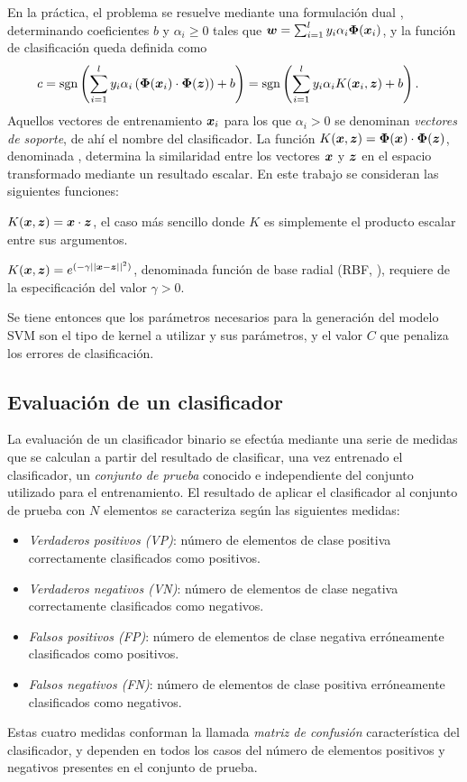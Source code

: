 \documentclass[12pt,bibliography=oldstyle,DIV=12,parskip=half-]{scrreprt}
\begin{document}
En la práctica, el problema se resuelve mediante una formulación
dual \cite{bottou}, determinando
coeficientes $b$ y $\alpha_i\geq0$ tales que $\boldsymbol{w}=\sum_{i=1}^l
y_i\alpha_i\boldsymbol{\Phi}(\boldsymbol{x}_i)$, y la función de clasificación queda
definida como
\begin{align}
  c &= \textrm{sgn}\left(\sum_{i=1}^l
  y_i\alpha_i\left(\boldsymbol{\Phi}(\boldsymbol{x}_i)\cdot\boldsymbol{\Phi}(\boldsymbol{z})\right)+b\right) =
  \textrm{sgn}\left(\sum_{i=1}^l y_i\alpha_iK(\boldsymbol{x}_i,\boldsymbol{z})+b\right).
\end{align}
Aquellos vectores de entrenamiento $\boldsymbol{x}_i$ para los que $\alpha_i >
0$ se denominan \emph{vectores de soporte}, de ahí el nombre del
clasificador.  La función
$K(\boldsymbol{x},\boldsymbol{z})=\boldsymbol{\Phi}(\boldsymbol{x})\cdot\boldsymbol{\Phi}(\boldsymbol{z})$, denominada
, determina la similaridad entre los vectores $\boldsymbol{x}$ y
$\boldsymbol{z}$ en el espacio transformado mediante un resultado escalar. En
este trabajo se consideran las siguientes funciones:
\begin{description}
  [style=sameline,leftmargin=5cm,itemsep=6pt,align=right]
  \item[Lineal:] $K(\boldsymbol{x},\boldsymbol{z})=\boldsymbol{x}\cdot\boldsymbol{z}$, el caso
    más sencillo donde $K$ es simplemente el producto escalar entre
    sus argumentos.
\item[RBF:] $K(\boldsymbol{x},\boldsymbol{z})=e^{(-\gamma||\boldsymbol{x}-\boldsymbol{z}||^2)}$,
  denominada función de base radial (RBF, ), requiere de la especificación del valor $\gamma>0$.
\end{description}
Se tiene entonces que los parámetros necesarios para la generación del
modelo SVM son el tipo de kernel a utilizar y sus parámetros, y el
valor $C$ que penaliza los errores de clasificación.
%
%
\subsection{Evaluación de un clasificador}
%
La evaluación de un clasificador binario se efectúa
mediante una serie de medidas que se calculan a partir del resultado
de clasificar, una vez entrenado el clasificador, un \emph{conjunto de
  prueba} conocido e independiente del conjunto utilizado para el
entrenamiento.
El resultado de aplicar el clasificador al conjunto de prueba
con $N$ elementos se caracteriza según las
siguientes medidas:
%
\begin{itemize}[style=nextline,leftmargin=5em]
  \item\emph{Verdaderos positivos (VP)}: número de elementos de clase
    positiva correctamente clasificados como positivos.
  \item\emph{Verdaderos negativos (VN)}: número de elementos de clase
    negativa correctamente clasificados como negativos.
  \item\emph{Falsos positivos (FP)}: número de elementos de clase
    negativa erróneamente clasificados como positivos.
  \item\emph{Falsos negativos (FN)}: número de elementos de clase
    positiva erróneamente clasificados como negativos.
\end{itemize}
%
Estas cuatro medidas conforman la llamada \emph{matriz de confusión}
característica del clasificador, y dependen en todos los casos del
número de elementos positivos y negativos presentes en el conjunto de
prueba.
\end{document}
